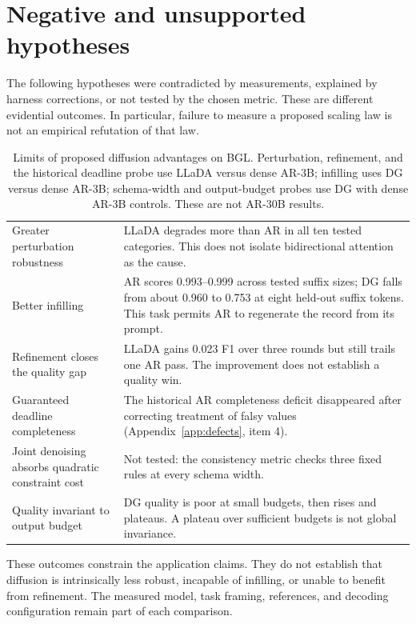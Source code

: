 \section{Negative and unsupported hypotheses}
\label{app:refuted}

The following hypotheses were contradicted by measurements, explained by
harness corrections, or not tested by the chosen metric. These are different
evidential outcomes. In particular, failure to measure a proposed scaling
law is not an empirical refutation of that law.

\begin{table}[ht]
\centering
\caption{Limits of proposed diffusion advantages on BGL. Perturbation,
refinement, and the historical deadline probe use LLaDA versus dense
AR-3B; infilling uses DG versus dense AR-3B; schema-width and output-budget
probes use DG with dense AR-3B controls. These are not AR-30B results.}
\label{tab:refuted}
\begin{tabularx}{\linewidth}{@{}>{\raggedright\arraybackslash}p{4.2cm}L@{}}
\toprule
{} &  \\
\midrule
\tabfont Greater perturbation robustness & \tabfont LLaDA degrades more than AR in all ten tested categories. This does not isolate bidirectional attention as the cause. \\
\tabfont Better infilling & \tabfont AR scores 0.993--0.999 across tested suffix sizes; DG falls from about 0.960 to 0.753 at eight held-out suffix tokens. This task permits AR to regenerate the record from its prompt. \\
\tabfont Refinement closes the quality gap & \tabfont LLaDA gains 0.023 F1 over three rounds but still trails one AR pass. The improvement does not establish a quality win. \\
\tabfont Guaranteed deadline completeness & \tabfont The historical AR completeness deficit disappeared after correcting treatment of falsy values (Appendix~\ref{app:defects}, item 4). \\
\tabfont Joint denoising absorbs quadratic constraint cost & \tabfont Not tested: the consistency metric checks three fixed rules at every schema width. \\
\tabfont Quality invariant to output budget & \tabfont DG quality is poor at small budgets, then rises and plateaus. A plateau over sufficient budgets is not global invariance. \\
\bottomrule
\end{tabularx}
\end{table}

These outcomes constrain the application claims. They do not establish
that diffusion is intrinsically less robust, incapable of infilling, or
unable to benefit from refinement. The measured model, task framing,
references, and decoding configuration remain part of each comparison.
